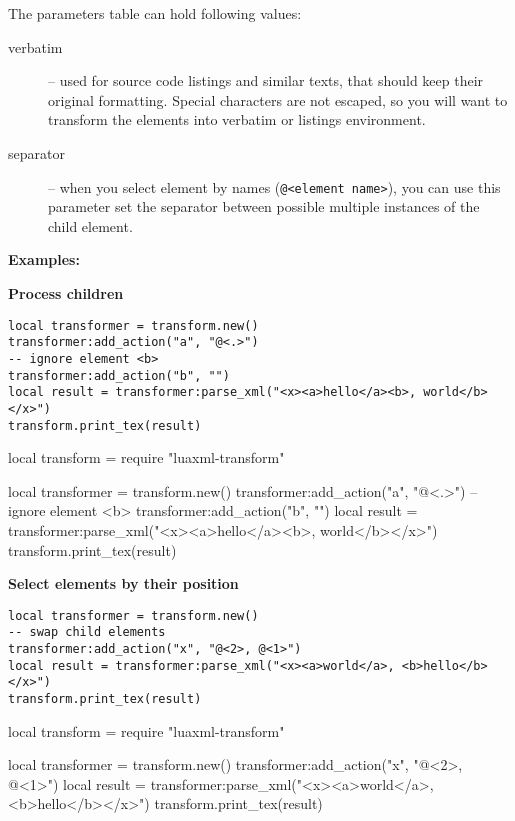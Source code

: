 \documentclass{ltxdoc}
\begin{document}
The parameters table can hold following values:

\begin{description}
  \item[verbatim] -- used for source code listings and similar texts, that should keep their original formatting. 
    Special characters are not escaped, so you will want to transform the elements into verbatim or listings environment.
  \item[separator] -- when you select element by names (\verb|@<element name>|), you can use this parameter
    set the separator between possible multiple instances of the child element.
\end{description}

\noindent\textbf{Examples:}

\noindent\textbf{Process children}

\begin{verbatim}
local transformer = transform.new()
transformer:add_action("a", "@<.>")
-- ignore element <b>
transformer:add_action("b", "")
local result = transformer:parse_xml("<x><a>hello</a><b>, world</b></x>")
transform.print_tex(result)
\end{verbatim}
\begin{framed}
\begin{luacode*}

local transform = require "luaxml-transform"

local transformer = transform.new()
transformer:add_action("a", "@<.>")
-- ignore element <b>
transformer:add_action("b", "")
local result = transformer:parse_xml("<x><a>hello</a><b>, world</b></x>")
transform.print_tex(result)
\end{luacode*}
\end{framed}

\noindent\textbf{Select elements by their position}

\begin{verbatim}
local transformer = transform.new()
-- swap child elements
transformer:add_action("x", "@<2>, @<1>")
local result = transformer:parse_xml("<x><a>world</a>, <b>hello</b></x>")
transform.print_tex(result)
\end{verbatim}

\begin{framed}
\begin{luacode*}

local transform = require "luaxml-transform"

local transformer = transform.new()
transformer:add_action("x", "@<2>, @<1>")
local result = transformer:parse_xml("<x><a>world</a>, <b>hello</b></x>")
transform.print_tex(result)
\end{luacode*}
\end{framed}
\end{document}
